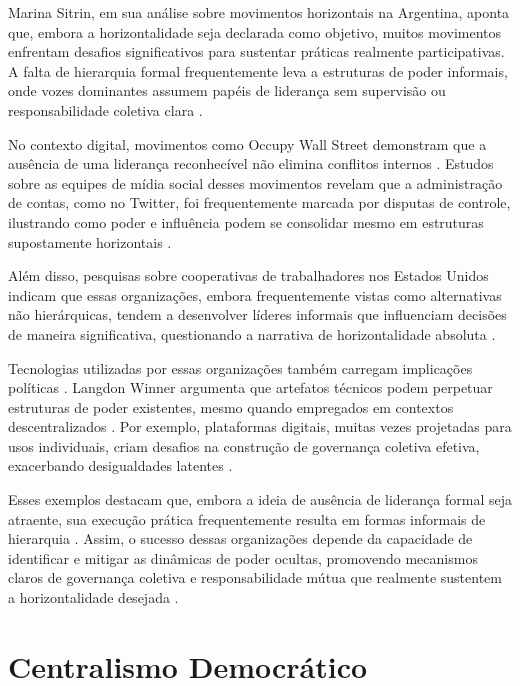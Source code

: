 Marina Sitrin, em sua análise sobre movimentos horizontais na Argentina,
aponta que, embora a horizontalidade seja declarada como objetivo, muitos
movimentos enfrentam desafios significativos para sustentar práticas
realmente participativas. A falta de hierarquia formal frequentemente leva
a estruturas de poder informais, onde vozes dominantes assumem papéis de
liderança sem supervisão ou responsabilidade coletiva clara
\cite{EverydayRevolutions}.

No contexto digital, movimentos como Occupy Wall Street demonstram que a
ausência de uma liderança reconhecível não elimina conflitos internos
\cite{SocialMediaTeamsAsDigitalVanguards}.
Estudos sobre as equipes de mídia social desses movimentos revelam que a
administração de contas, como no Twitter, foi frequentemente marcada por
disputas de controle, ilustrando como poder e influência podem se
consolidar mesmo em estruturas supostamente horizontais
\cite{SocialMediaTeamsAsDigitalVanguards}.

Além disso, pesquisas sobre cooperativas de trabalhadores nos Estados
Unidos indicam que essas organizações, embora frequentemente vistas como
alternativas não hierárquicas, tendem a desenvolver líderes informais que
influenciam decisões de maneira significativa, questionando a narrativa de
horizontalidade absoluta \cite{WorkerCooperativesandRevolution}.

Tecnologias utilizadas por essas organizações também carregam implicações
políticas \cite{DoArtifactsHavePolitics}. Langdon Winner argumenta
que artefatos técnicos podem perpetuar estruturas de poder
existentes, mesmo quando empregados em contextos
descentralizados \cite{DoArtifactsHavePolitics}. Por exemplo, plataformas digitais,
muitas vezes projetadas para usos individuais, criam desafios na construção de
governança coletiva efetiva, exacerbando desigualdades latentes
\cite{DoArtifactsHavePolitics}.

Esses exemplos destacam que, embora a ideia de ausência de liderança formal
seja atraente, sua execução prática frequentemente resulta em formas
informais de hierarquia \cite{EverydayRevolutions, SocialMediaTeamsAsDigitalVanguards}.
Assim, o sucesso dessas organizações depende da
capacidade de identificar e mitigar as dinâmicas de poder ocultas,
promovendo mecanismos claros de governança coletiva e responsabilidade
mútua que realmente sustentem a horizontalidade desejada \cite{Colbac}.

\section{Centralismo Democrático}
\label{sec:centralismo_democratico}

